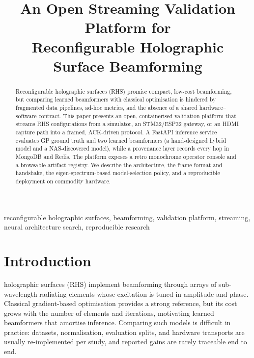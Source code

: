 \documentclass[conference]{IEEEtran}
\begin{document}
\title{An Open Streaming Validation Platform for\\Reconfigurable Holographic Surface Beamforming}

\author{
}

\maketitle

\begin{abstract}
Reconfigurable holographic surfaces (RHS) promise compact, low-cost
beamforming, but comparing learned beamformers with classical optimisation is
hindered by fragmented data pipelines, ad-hoc metrics, and the absence of a
shared hardware--software contract. This paper presents an open, containerised
validation platform that streams RHS configurations from a simulator, an
STM32/ESP32 gateway, or an HDMI capture path into a framed, ACK-driven
protocol. A FastAPI inference service evaluates GP ground truth and two learned
beamformers (a hand-designed hybrid model and a NAS-discovered model), while a
provenance layer records every hop in MongoDB and Redis. The platform exposes a
retro monochrome operator console and a browsable artifact registry. We describe
the architecture, the frame format and handshake, the eigen-spectrum-based
model-selection policy, and a reproducible deployment on commodity hardware.
\end{abstract}

\begin{IEEEkeywords}
reconfigurable holographic surfaces, beamforming, validation platform,
streaming, neural architecture search, reproducible research
\end{IEEEkeywords}

\section{Introduction}
 holographic surfaces (RHS) implement
beamforming through arrays of sub-wavelength radiating elements whose
excitation is tuned in amplitude and phase. Classical gradient-based
optimisation provides a strong reference, but its cost grows with the number of
elements and iterations, motivating learned beamformers that amortise inference.
Comparing such models is difficult in practice: datasets, normalisation,
evaluation splits, and hardware transports are usually re-implemented per
study, and reported gains are rarely traceable end to end.
\end{document}
